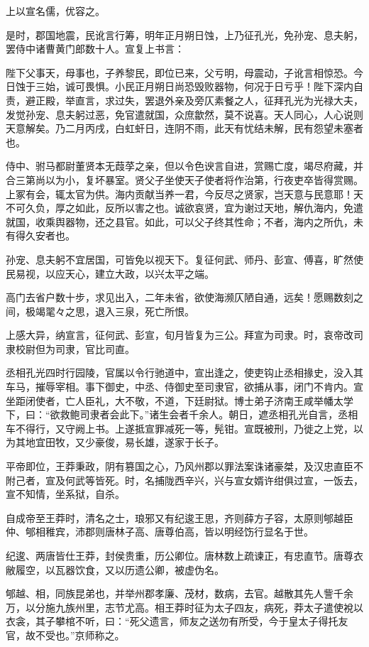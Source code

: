\documentclass[]{article}
\begin{document}
上以宣名儒，优容之。

是时，郡国地震，民讹言行筹，明年正月朔日蚀，上乃征孔光，免孙宠、息夫躬，罢侍中诸曹黄门郎数十人。宣复上书言：

陛下父事天，母事也，子养黎民，即位已来，父亏明，母震动，子讹言相惊恐。今日蚀于三始，诚可畏惧。小民正月朔日尚恐毁败器物，何况于日亏乎！陛下深内自责，避正殿，举直言，求过失，罢退外亲及旁仄素餐之人，征拜孔光为光禄大夫，发觉孙宠、息夫躬过恶，免官遣就国，众庶歙然，莫不说喜。天人同心，人心说则天意解矣。乃二月丙戌，白虹虷日，连阴不雨，此天有忧结未解，民有怨望未塞者也。

侍中、驸马都尉董贤本无葭莩之亲，但以令色谀言自进，赏赐亡度，竭尽府藏，并合三第尚以为小，复坏暴室。贤父子坐使天子使者将作治第，行夜吏卒皆得赏赐。上冢有会，辄太官为供。海内贡献当养一君，今反尽之贤家，岂天意与民意耶！天不可久负，厚之如此，反所以害之也。诚欲哀贤，宜为谢过天地，解仇海内，免遣就国，收乘舆器物，还之县官。如此，可以父子终其性命；不者，海内之所仇，未有得久安者也。

孙宠、息夫躬不宜居国，可皆免以视天下。复征何武、师丹、彭宣、傅喜，旷然使民易视，以应天心，建立大政，以兴太平之端。

高门去省户数十步，求见出入，二年未省，欲使海濒仄陋自通，远矣！愿赐数刻之间，极竭毣々之思，退入三泉，死亡所恨。

上感大异，纳宣言，征何武、彭宣，旬月皆复为三公。拜宣为司隶。时，哀帝改司隶校尉但为司隶，官比司直。

丞相孔光四时行园陵，官属以令行驰道中，宣出逢之，使吏钩止丞相掾史，没入其车马，摧辱宰相。事下御史，中丞、侍御史至司隶官，欲捕从事，闭门不肯内。宣坐距闭使者，亡人臣礼，大不敬，不道，下廷尉狱。博士弟子济南王咸举幡太学下，曰：``欲救鲍司隶者会此下。''诸生会者千余人。朝日，遮丞相孔光自言，丞相车不得行，又守阙上书。上遂抵宣罪减死一等，髡钳。宣既被刑，乃徙之上党，以为其地宜田牧，又少豪俊，易长雄，遂家于长子。

平帝即位，王莽秉政，阴有篡国之心，乃风州郡以罪法案诛诸豪桀，及汉忠直臣不附己者，宣及何武等皆死。时，名捕陇西辛兴，兴与宣女婿许绀俱过宣，一饭去，宣不知情，坐系狱，自杀。

自成帝至王莽时，清名之士，琅邪又有纪逡王思，齐则薛方子容，太原则郇越臣仲、郇相稚宾，沛郡则唐林子高、唐尊伯高，皆以明经饬行显名于世。

纪逡、两唐皆仕王莽，封侯贵重，历公卿位。唐林数上疏谏正，有忠直节。唐尊衣敝履空，以瓦器饮食，又以历遗公卿，被虚伪名。

郇越、相，同族昆弟也，并举州郡孝廉、茂材，数病，去官。越散其先人訾千余万，以分施九族州里，志节尤高。相王莽时征为太子四友，病死，莽太子遣使裞以衣衾，其子攀棺不听，曰：``死父遗言，师友之送勿有所受，今于皇太子得托友官，故不受也。''京师称之。
\end{document}
